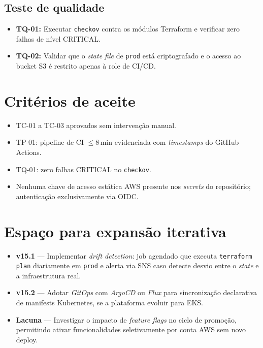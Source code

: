 \subsection{Teste de qualidade}

\begin{itemize}[leftmargin=*]
  \item \textbf{TQ-01:} Executar \texttt{checkov} contra os m\'odulos
        Terraform e verificar zero falhas de n\'ivel CRITICAL.
  \item \textbf{TQ-02:} Validar que o \textit{state file} de
        \texttt{prod} est\'a criptografado e o acesso ao bucket S3
        \'e restrito apenas \`a role de CI/CD.
\end{itemize}

\section{Crit\'erios de aceite}

\begin{itemize}[leftmargin=*]
  \item TC-01 a TC-03 aprovados sem interven\c{c}\~ao manual.
  \item TP-01: pipeline de CI $\leq 8$\,min evidenciada com
        \textit{timestamps} do GitHub Actions.
  \item TQ-01: zero falhas CRITICAL no \texttt{checkov}.
  \item Nenhuma chave de acesso est\'atica AWS presente nos
        \textit{secrets} do reposit\'orio; autentica\c{c}\~ao
        exclusivamente via OIDC.
\end{itemize}

\section{Espa\c{c}o para expans\~ao iterativa}

\begin{itemize}[leftmargin=*]
  \item \textbf{v15.1} --- Implementar \textit{drift detection}:
        job agendado que executa \texttt{terraform plan} diariamente em
        \texttt{prod} e alerta via SNS caso detecte desvio
        entre o \textit{state} e a infraestrutura real.
  \item \textbf{v15.2} --- Adotar \textit{GitOps} com
        \textit{ArgoCD} ou \textit{Flux} para sincroniza\c{c}\~ao
        declarativa de manifests Kubernetes, se a plataforma evoluir
        para EKS.
  \item \textbf{Lacuna} --- Investigar o impacto de \textit{feature flags}
        no ciclo de promo\c{c}\~ao, permitindo ativar funcionalidades
        seletivamente por conta AWS sem novo deploy.
\end{itemize}
